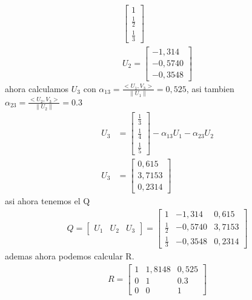 \begin{enumerate}
\begin{align*}
\begin{bmatrix}
1\\[6pt]
\frac{1}{2}\\[6pt]
\frac{1}{3}
\end{bmatrix}
\\
U_2 =
\begin{bmatrix}
-1,314\\
-0,5740\\
-0,3548
\end{bmatrix}
\end{align*}
ahora calculamos $U_3$ con $\alpha_{13}=\frac{<U_1,V_3>}{\parallel U_1\parallel} = 0,525$, asi tambien$\alpha_{23}=\frac{<U_2,V_3>}{\parallel U_2\parallel} = 0.3$
\begin{align*}
U_3 &= 
\begin{bmatrix}
\frac{1}{3}\\[6pt]
\frac{1}{4}\\[6pt]
\frac{1}{5}
\end{bmatrix}-
\alpha_{13}U_1-\alpha_{23}U_2 \\
U_3 &= 
\begin{bmatrix}
0,615\\
3,7153\\
0,2314
\end{bmatrix}
\end{align*}
asi ahora tenemos  el Q 
\begin{align*}
Q =
\begin{bmatrix}
U_1 &U_2 &U_3
\end{bmatrix}
=
\begin{bmatrix}
1			&-1,314	 &0,615 \\[6pt]
\frac{1}{2}	&-0,5740 &3,7153\\[6pt]
\frac{1}{3} &-0,3548 &0,2314
\end{bmatrix}
\end{align*}
ademas ahora podemos calcular R.
\begin{align*}
R=
\begin{bmatrix}
1	&1,8148  &0,525\\
0   &1       &0.3\\
0   &0       &1
\end{bmatrix}
\end{align*}

\end{enumerate}